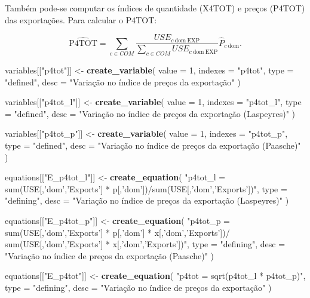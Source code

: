 \documentclass[12pt,twoside]{article}
\newenvironment{Shaded}{\begin{snugshade}}{\end{snugshade}}
\newcommand{\DataTypeTok}[1]{\textcolor[rgb]{0.13,0.29,0.53}{#1}}
\newcommand{\DecValTok}[1]{\textcolor[rgb]{0.00,0.00,0.81}{#1}}
\newcommand{\KeywordTok}[1]{\textcolor[rgb]{0.13,0.29,0.53}{\textbf{#1}}}
\newcommand{\NormalTok}[1]{#1}
\newcommand{\StringTok}[1]{\textcolor[rgb]{0.31,0.60,0.02}{#1}}
\let\oldShaded\Shaded
\let\endoldShaded\endShaded
\renewenvironment{Shaded}{\footnotesize\oldShaded}{\endoldShaded}
\begin{document}
Também pode-se computar os índices de quantidade (X4TOT) e preços
(P4TOT) das exportações. Para calcular o P4TOT:

\[\hat{\text{P4TOT}} = \sum_{c\in COM}\frac{USE_{c~\text{dom}~\text{EXP}}}{\sum_{c\in COM}USE_{c~\text{dom}~\text{EXP}}}\hat{P}_{c~\text{dom}}.\]

\begin{Shaded}
\begin{Highlighting}[]
\NormalTok{variables[[}\StringTok{"p4tot"}\NormalTok{]] <-}\StringTok{ }\KeywordTok{create_variable}\NormalTok{(}
  \DataTypeTok{value =} \DecValTok{1}\NormalTok{,}
  \DataTypeTok{indexes =} \StringTok{"p4tot"}\NormalTok{,}
  \DataTypeTok{type =} \StringTok{"defined"}\NormalTok{,}
  \DataTypeTok{desc =} \StringTok{"Variação no índice de preços da exportação"}
\NormalTok{)}

\NormalTok{variables[[}\StringTok{"p4tot_l"}\NormalTok{]] <-}\StringTok{ }\KeywordTok{create_variable}\NormalTok{(}
  \DataTypeTok{value =} \DecValTok{1}\NormalTok{,}
  \DataTypeTok{indexes =} \StringTok{"p4tot_l"}\NormalTok{,}
  \DataTypeTok{type =} \StringTok{"defined"}\NormalTok{,}
  \DataTypeTok{desc =} \StringTok{"Variação no índice de preços da exportação (Laspeyres)"}
\NormalTok{)}

\NormalTok{variables[[}\StringTok{"p4tot_p"}\NormalTok{]] <-}\StringTok{ }\KeywordTok{create_variable}\NormalTok{(}
  \DataTypeTok{value =} \DecValTok{1}\NormalTok{,}
  \DataTypeTok{indexes =} \StringTok{"p4tot_p"}\NormalTok{,}
  \DataTypeTok{type =} \StringTok{"defined"}\NormalTok{,}
  \DataTypeTok{desc =} \StringTok{"Variação no índice de preços da exportação (Paasche)"}
\NormalTok{)}

\NormalTok{equations[[}\StringTok{"E_p4tot_l"}\NormalTok{]] <-}\StringTok{ }\KeywordTok{create_equation}\NormalTok{(}
  \StringTok{"p4tot_l = sum(USE[,'dom','Exports'] * p[,'dom'])/sum(USE[,'dom','Exports'])"}\NormalTok{,}
  \DataTypeTok{type =} \StringTok{"defining"}\NormalTok{,}
  \DataTypeTok{desc =} \StringTok{"Variação no índice de preços da exportação (Laspeyres)"}
\NormalTok{)}

\NormalTok{equations[[}\StringTok{"E_p4tot_p"}\NormalTok{]] <-}\StringTok{ }\KeywordTok{create_equation}\NormalTok{(}
  \StringTok{"p4tot_p = sum(USE[,'dom','Exports'] * p[,'dom'] * x[,'dom','Exports'])/}
\StringTok{  sum(USE[,'dom','Exports'] * x[,'dom','Exports'])"}\NormalTok{,}
  \DataTypeTok{type =} \StringTok{"defining"}\NormalTok{,}
  \DataTypeTok{desc =} \StringTok{"Variação no índice de preços da exportação (Paasche)"}
\NormalTok{)}

\NormalTok{equations[[}\StringTok{"E_p4tot"}\NormalTok{]] <-}\StringTok{ }\KeywordTok{create_equation}\NormalTok{(}
  \StringTok{"p4tot = sqrt(p4tot_l * p4tot_p)"}\NormalTok{,}
  \DataTypeTok{type =} \StringTok{"defining"}\NormalTok{,}
  \DataTypeTok{desc =} \StringTok{"Variação no índice de preços da exportação"}
\NormalTok{)}
\end{Highlighting}
\end{Shaded}
\end{document}
